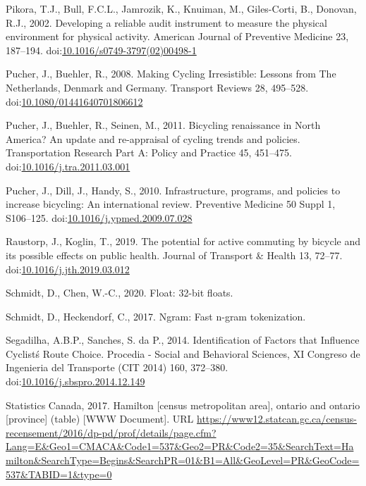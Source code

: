\documentclass[]{elsarticle} %
\begin{document}
\leavevmode\hypertarget{ref-pikoraDevelopingReliableAudit2002}{}%
Pikora, T.J., Bull, F.C.L., Jamrozik, K., Knuiman, M., Giles-Corti, B.,
Donovan, R.J., 2002. Developing a reliable audit instrument to measure
the physical environment for physical activity. American Journal of
Preventive Medicine 23, 187--194.
doi:\href{https://doi.org/10.1016/s0749-3797(02)00498-1}{10.1016/s0749-3797(02)00498-1}

\leavevmode\hypertarget{ref-pucherMakingCyclingIrresistible2008}{}%
Pucher, J., Buehler, R., 2008. Making Cycling Irresistible: Lessons from
The Netherlands, Denmark and Germany. Transport Reviews 28, 495--528.
doi:\href{https://doi.org/10.1080/01441640701806612}{10.1080/01441640701806612}

\leavevmode\hypertarget{ref-pucherBicyclingRenaissanceNorth2011a}{}%
Pucher, J., Buehler, R., Seinen, M., 2011. Bicycling renaissance in
North America? An update and re-appraisal of cycling trends and
policies. Transportation Research Part A: Policy and Practice 45,
451--475.
doi:\href{https://doi.org/10.1016/j.tra.2011.03.001}{10.1016/j.tra.2011.03.001}

\leavevmode\hypertarget{ref-pucherInfrastructureProgramsPolicies2010a}{}%
Pucher, J., Dill, J., Handy, S., 2010. Infrastructure, programs, and
policies to increase bicycling: An international review. Preventive
Medicine 50 Suppl 1, S106--125.
doi:\href{https://doi.org/10.1016/j.ypmed.2009.07.028}{10.1016/j.ypmed.2009.07.028}

\leavevmode\hypertarget{ref-raustorpPotentialActiveCommuting2019}{}%
Raustorp, J., Koglin, T., 2019. The potential for active commuting by
bicycle and its possible effects on public health. Journal of Transport
\& Health 13, 72--77.
doi:\href{https://doi.org/10.1016/j.jth.2019.03.012}{10.1016/j.jth.2019.03.012}

\leavevmode\hypertarget{ref-R-float}{}%
Schmidt, D., Chen, W.-C., 2020. Float: 32-bit floats.

\leavevmode\hypertarget{ref-R-ngram}{}%
Schmidt, D., Heckendorf, C., 2017. Ngram: Fast n-gram tokenization.

\leavevmode\hypertarget{ref-segadilhaIdentificationFactorsThat2014a}{}%
Segadilha, A.B.P., Sanches, S. da P., 2014. Identification of Factors
that Influence Cyclistś Route Choice. Procedia - Social and Behavioral
Sciences, XI Congreso de Ingenieria del Transporte (CIT 2014) 160,
372--380.
doi:\href{https://doi.org/10.1016/j.sbspro.2014.12.149}{10.1016/j.sbspro.2014.12.149}

\leavevmode\hypertarget{ref-Statistics2016}{}%
Statistics Canada, 2017. Hamilton {[}census metropolitan area{]},
ontario and ontario {[}province{]} (table) {[}WWW Document{]}. URL
\url{https://www12.statcan.gc.ca/census-recensement/2016/dp-pd/prof/details/page.cfm?Lang=E\&Geo1=CMACA\&Code1=537\&Geo2=PR\&Code2=35\&SearchText=Hamilton\&SearchType=Begins\&SearchPR=01\&B1=All\&GeoLevel=PR\&GeoCode=537\&TABID=1\&type=0}
\end{document}
